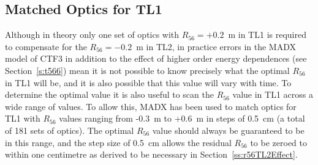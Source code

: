 
\subsection{Matched Optics for TL1}
\label{ss:tl1Optics}

Although in theory only one set of optics with \(R_{56} = +0.2\)~m in TL1 is required to compensate for the \(R_{56} = -0.2\)~m in TL2, in practice errors in the MADX model of CTF3 in addition to the effect of higher order energy dependences (see Section~\ref{s:t566}) mean it is not possible to know precisely what the optimal \(R_{56}\) in TL1 will be, and it is also possible that this value will vary with time. To determine the optimal value it is also useful to scan the \(R_{56}\) value in TL1 across a wide range of values.%
To allow this, MADX has been used to match optics for TL1 with \(R_{56}\) values ranging from -0.3~m to +0.6~m in steps of 0.5~cm (a total of 181 sets of optics). The optimal \(R_{56}\) value should always be guaranteed to be in this range, and the step size of 0.5~cm allows the residual \(R_{56}\) to be zeroed to within one centimetre as derived to be necessary in Section~\ref{ss:r56TL2Effect}. 

